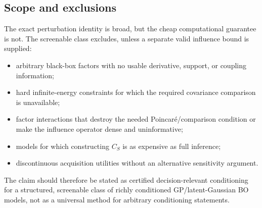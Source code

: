 \subsection{Scope and exclusions}

The exact perturbation identity is broad, but the cheap computational guarantee
is not.  The screenable class excludes, unless a separate valid influence bound
is supplied:

\begin{itemize}
    \item arbitrary black-box factors with no usable derivative, support, or
          coupling information;
    \item hard infinite-energy constraints for which the required covariance
          comparison is unavailable;
    \item factor interactions that destroy the needed Poincar\'e/comparison
          condition or make the influence operator dense and uninformative;
    \item models for which constructing $C_S$ is as expensive as full inference;
    \item discontinuous acquisition utilities without an alternative sensitivity
          argument.
\end{itemize}

The claim should therefore be stated as certified decision-relevant conditioning
for a structured, screenable class of richly conditioned GP/latent-Gaussian BO
models, not as a universal method for arbitrary conditioning statements.
